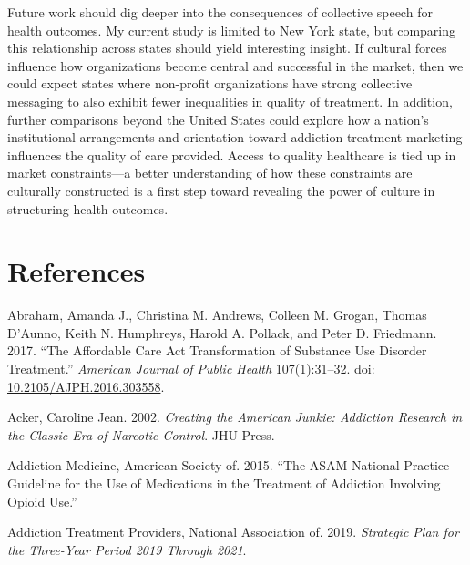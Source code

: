 \documentclass[
  12pt,
]{article}
\begin{document}
\vspace{12pt}

Future work should dig deeper into the consequences of collective speech for health outcomes. My current study is limited to New York state, but comparing this relationship across states should yield interesting insight. If cultural forces influence how organizations become central and successful in the market, then we could expect states where non-profit organizations have strong collective messaging to also exhibit fewer inequalities in quality of treatment. In addition, further comparisons beyond the United States could explore how a nation's institutional arrangements and orientation toward addiction treatment marketing influences the quality of care provided. Access to quality healthcare is tied up in market constraints---a better understanding of how these constraints are culturally constructed is a first step toward revealing the power of culture in structuring health outcomes.

\clearpage

\hypertarget{references}{%
\section{References}\label{references}}

\setlength{\parindent}{-0.2in}
\setlength{\leftskip}{0.2in}
\setlength{\parskip}{8pt}

\noindent

\hypertarget{refs}{}
\leavevmode\hypertarget{ref-abraham2017}{}%
Abraham, Amanda J., Christina M. Andrews, Colleen M. Grogan, Thomas D'Aunno, Keith N. Humphreys, Harold A. Pollack, and Peter D. Friedmann. 2017. ``The Affordable Care Act Transformation of Substance Use Disorder Treatment.'' \emph{American Journal of Public Health} 107(1):31--32. doi: \href{https://doi.org/10.2105/AJPH.2016.303558}{10.2105/AJPH.2016.303558}.

\leavevmode\hypertarget{ref-acker2002}{}%
Acker, Caroline Jean. 2002. \emph{Creating the American Junkie: Addiction Research in the Classic Era of Narcotic Control}. JHU Press.

\leavevmode\hypertarget{ref-americansocietyofaddictionmedicine2015}{}%
Addiction Medicine, American Society of. 2015. ``The ASAM National Practice Guideline for the Use of Medications in the Treatment of Addiction Involving Opioid Use.''

\leavevmode\hypertarget{ref-nationalassociationofaddictiontreatmentproviders2019}{}%
Addiction Treatment Providers, National Association of. 2019. \emph{Strategic Plan for the Three-Year Period 2019 Through 2021}.
\end{document}
